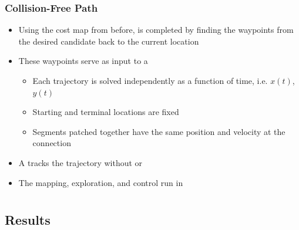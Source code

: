 \documentclass[11pt,professionalfonts,hyperref={pdftex,pdfpagemode=none,pdfstartview=FitH}]{beamer}
\renewcommand{\emph}[1]{\textit{\textbf{\color{blue}{#1}}}}
\begin{document}
\begin{frame}
\frametitle{Collision-Free Path}

\begin{itemize}
	\item Using the cost map from before, \emph{Dijkstra's algorithm} is completed by finding the waypoints from the desired candidate back to the current location
	\vspace*{0.0cm}\pause
	\item These waypoints serve as input to a \emph{constrained polynomial least squares trajectory}
	\begin{itemize}
		\item Each trajectory is solved independently as a function of time, i.e. $x(t)$, $y(t)$
		\item Starting and terminal locations are fixed
		\item Segments patched together have the same position and velocity at the connection
	\end{itemize}
	\vspace*{0.0cm}\pause
	\item A \emph{geometric controller} tracks the trajectory without \emph{singularities} or \emph{ambiguities}
	\vspace*{0.0cm}\pause
	\item The mapping, exploration, and control run in \emph{real-time}
\end{itemize}

\end{frame}

\section*{}
\subsection*{Results}
\end{document}
